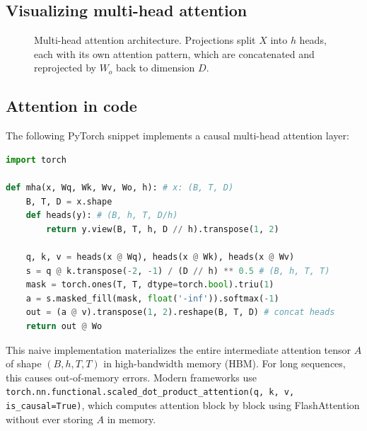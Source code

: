 \documentclass[11pt,a4paper]{article}
\newcommand{\slides}[1]{\par\nopagebreak\noindent{\normalfont\small\emph{(slides #1)}}\par\nopagebreak\vspace{2pt}}
\theoremstyle{definition}
\theoremstyle{plain}
\begin{document}
\subsection{Visualizing multi-head attention}\slides{39 / 84}
\begin{figure}[H]
\centering
{}
\caption{Multi-head attention architecture. Projections split $X$ into $h$ heads, each with its own attention pattern, which are concatenated and reprojected by $W_o$ back to dimension $D$.}\label{fig:mha_vis}
\end{figure}

\subsection{Attention in code}\slides{40 / 84}
The following PyTorch snippet implements a causal multi-head attention layer:
\begin{lstlisting}[language=Python]
import torch

def mha(x, Wq, Wk, Wv, Wo, h): # x: (B, T, D)
    B, T, D = x.shape
    def heads(y): # (B, h, T, D/h)
        return y.view(B, T, h, D // h).transpose(1, 2)
    
    q, k, v = heads(x @ Wq), heads(x @ Wk), heads(x @ Wv)
    s = q @ k.transpose(-2, -1) / (D // h) ** 0.5 # (B, h, T, T)
    mask = torch.ones(T, T, dtype=torch.bool).triu(1)
    a = s.masked_fill(mask, float('-inf')).softmax(-1)
    out = (a @ v).transpose(1, 2).reshape(B, T, D) # concat heads
    return out @ Wo
\end{lstlisting}
\begin{intuition}
This naive implementation materializes the entire intermediate attention tensor $A$ of shape $(B, h, T, T)$ in high-bandwidth memory (HBM). For long sequences, this causes out-of-memory errors. Modern frameworks use \texttt{torch.nn.functional.scaled\_dot\_product\_attention(q, k, v, is\_causal=True)}, which computes attention block by block using FlashAttention without ever storing $A$ in memory.
\end{intuition}
\end{document}
